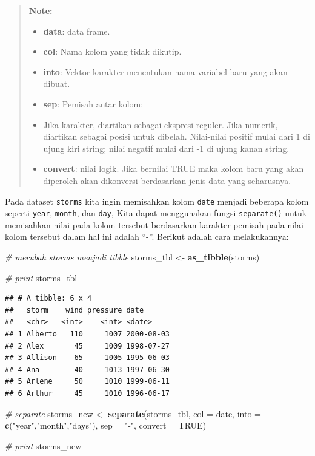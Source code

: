 \documentclass[]{book}
\newenvironment{Shaded}{\begin{snugshade}}{\end{snugshade}}
\newcommand{\KeywordTok}[1]{\textcolor[rgb]{0.13,0.29,0.53}{\textbf{#1}}}
\newcommand{\DataTypeTok}[1]{\textcolor[rgb]{0.13,0.29,0.53}{#1}}
\newcommand{\StringTok}[1]{\textcolor[rgb]{0.31,0.60,0.02}{#1}}
\newcommand{\CommentTok}[1]{\textcolor[rgb]{0.56,0.35,0.01}{\textit{#1}}}
\newcommand{\OtherTok}[1]{\textcolor[rgb]{0.56,0.35,0.01}{#1}}
\newcommand{\NormalTok}[1]{#1}
\providecommand{\tightlist}{%
  \setlength{\itemsep}{0pt}\setlength{\parskip}{0pt}}
\begin{document}
\begin{quote}
\textbf{Note: }

\begin{itemize}
\tightlist
\item
  \textbf{data}: data frame.
\item
  \textbf{col}: Nama kolom yang tidak dikutip.
\item
  \textbf{into}: Vektor karakter menentukan nama variabel baru yang akan
  dibuat.
\item
  \textbf{sep}: Pemisah antar kolom:
\item
  Jika karakter, diartikan sebagai ekspresi reguler. Jika numerik,
  diartikan sebagai posisi untuk dibelah. Nilai-nilai positif mulai dari
  1 di ujung kiri string; nilai negatif mulai dari -1 di ujung kanan
  string.
\item
  \textbf{convert}: nilai logik. Jika bernilai TRUE maka kolom baru yang
  akan diperoleh akan dikonversi berdasarkan jenis data yang seharusnya.
\end{itemize}
\end{quote}

Pada dataset \texttt{storms} kita ingin memisahkan kolom \texttt{date}
menjadi beberapa kolom seperti \texttt{year}, \texttt{month}, dan
\texttt{day}, Kita dapat menggunakan fungsi \texttt{separate()} untuk
memisahkan nilai pada kolom tersebut berdasarkan karakter pemisah pada
nilai kolom tersebut dalam hal ini adalah ``-''. Berikut adalah cara
melakukannya:

\begin{Shaded}
\begin{Highlighting}[]
\CommentTok{# merubah storms menjadi tibble}
\NormalTok{storms_tbl <-}\StringTok{ }\KeywordTok{as_tibble}\NormalTok{(storms)}

\CommentTok{# print}
\NormalTok{storms_tbl}
\end{Highlighting}
\end{Shaded}

\begin{verbatim}
## # A tibble: 6 x 4
##   storm    wind pressure date      
##   <chr>   <int>    <int> <date>    
## 1 Alberto   110     1007 2000-08-03
## 2 Alex       45     1009 1998-07-27
## 3 Allison    65     1005 1995-06-03
## 4 Ana        40     1013 1997-06-30
## 5 Arlene     50     1010 1999-06-11
## 6 Arthur     45     1010 1996-06-17
\end{verbatim}

\begin{Shaded}
\begin{Highlighting}[]
\CommentTok{# separate}
\NormalTok{storms_new <-}\StringTok{ }\KeywordTok{separate}\NormalTok{(storms_tbl,}
                       \DataTypeTok{col =}\NormalTok{ date,}
                       \DataTypeTok{into =} \KeywordTok{c}\NormalTok{(}\StringTok{"year"}\NormalTok{,}\StringTok{"month"}\NormalTok{,}\StringTok{"days"}\NormalTok{),}
                       \DataTypeTok{sep =} \StringTok{"-"}\NormalTok{,}
                       \DataTypeTok{convert =} \OtherTok{TRUE}\NormalTok{)}

\CommentTok{# print}
\NormalTok{storms_new}
\end{Highlighting}
\end{Shaded}
\end{document}
